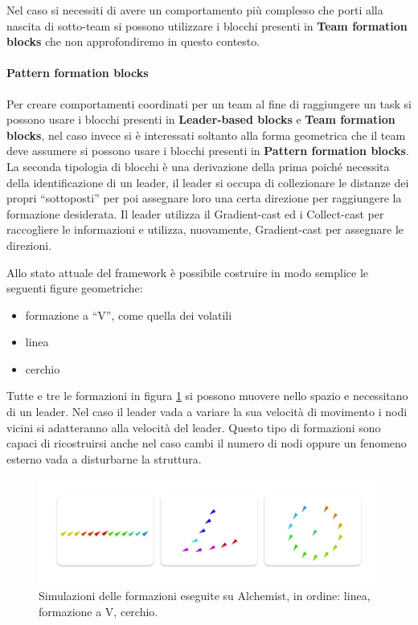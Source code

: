 \documentclass[12pt,a4paper,openright,twoside]{book}
\begin{document}
Nel caso si necessiti di avere un comportamento più complesso che porti alla nascita di sotto-team si possono utilizzare i blocchi presenti in \textbf{Team formation blocks} che non approfondiremo in questo contesto.

\paragraph{Pattern formation blocks}
Per creare comportamenti coordinati per un team al fine di raggiungere un task si possono usare i blocchi presenti in \textbf{Leader-based blocks} e \textbf{Team formation blocks}, nel caso invece si è interessati soltanto alla forma geometrica che il team deve assumere si possono usare i blocchi presenti in \textbf{Pattern formation blocks}. La seconda tipologia di blocchi è una derivazione della prima poiché necessita della identificazione di un leader, il leader si occupa di collezionare le distanze dei propri ``sottoposti'' per poi assegnare loro una certa direzione per raggiungere la formazione desiderata. Il leader utilizza il Gradient-cast ed i Collect-cast per raccogliere le informazioni e utilizza, nuovamente, Gradient-cast per assegnare le direzioni.

Allo stato attuale del framework è possibile costruire in modo semplice le seguenti figure geometriche:
\begin{itemize}
    \item formazione a ``V'', come quella dei volatili
    \item linea
    \item cerchio
\end{itemize}

Tutte e tre le formazioni in figura \ref{fig:formation-simulations} \cite{Macroswarm} si possono muovere nello spazio e necessitano di un leader. Nel caso il leader vada a variare la sua velocità di movimento i nodi vicini si adatteranno alla velocità del leader. Questo tipo di formazioni sono capaci di ricostruirsi anche nel caso cambi il numero di nodi oppure un fenomeno esterno vada a disturbarne la struttura.

\begin{figure}
    \centering
    \includegraphics[width=.9\linewidth]{figures/formation-simulations.pdf}
    \caption{Simulazioni delle formazioni eseguite su Alchemist, in ordine: linea, formazione a V, cerchio.}
    \label{fig:formation-simulations}
\end{figure}
\end{document}
